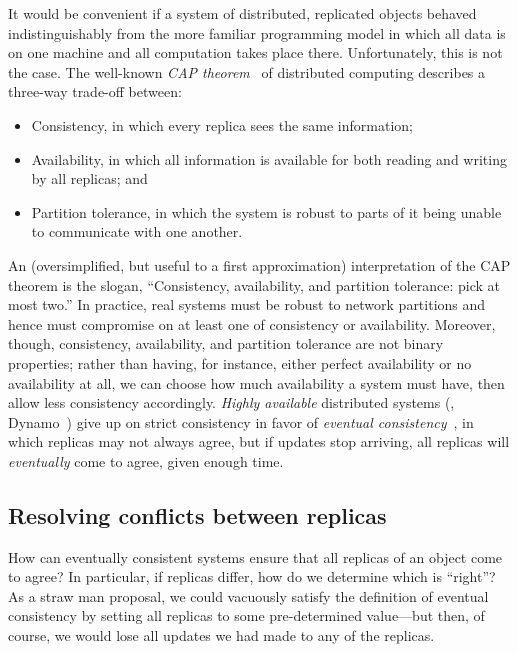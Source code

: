 \documentclass{article}
\begin{document}
It would be convenient if a system of distributed, replicated objects
behaved indistinguishably from the more familiar programming model in
which all data is on one machine and all computation takes place
there.  Unfortunately, this is not the case.  The well-known \emph{CAP
  theorem}~\cite{gilbert-lynch-cap} of distributed computing describes
a three-way trade-off between:
\begin{itemize}
\item Consistency, in which every replica sees the same information;
\item Availability, in which all information is available for both
  reading and writing by all replicas; and
\item Partition tolerance, in which the system is robust to parts of
  it being unable to communicate with one another.
\end{itemize}
An (oversimplified, but useful to a first approximation)
interpretation of the CAP theorem is the slogan, ``Consistency,
availability, and partition tolerance: pick at most two.''  In
practice, real systems must be robust to network partitions and hence
must compromise on at least one of consistency or availability.
Moreover, though, consistency, availability, and partition tolerance
are not binary properties; rather than having, for instance, either
perfect availability or no availability at all, we can choose how much
availability a system must have, then allow less consistency
accordingly.  \emph{Highly available} distributed systems (\eg,
Dynamo~\cite{dynamo}) give up on strict consistency in favor of
\emph{eventual consistency}~\cite{vogels-ec}, in which replicas may
not always agree, but if updates stop arriving, all replicas will
\emph{eventually} come to agree, given enough time.

\subsection{Resolving conflicts between replicas}

How can eventually consistent systems ensure that all replicas of an
object come to agree?  In particular, if replicas differ, how do we
determine which is ``right''?  As a straw man proposal, we could
vacuously satisfy the definition of eventual consistency by setting
all replicas to some pre-determined value---but then, of course, we
would lose all updates we had made to any of the replicas.
\end{document}
